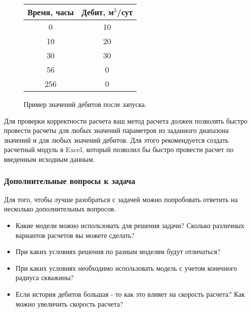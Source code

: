 
\begin{figure}[h!]
	\centering
	\begin{minipage}{0.45\textwidth}
		\centering
			\begin{tabular}{|c|c|}
				\hline
				\rowcolor{lightgray}	Время, часы& Дебит, м$^3$/сут  \\
				\hline
				0 & 10  \\
				\hline
				10 & 20  \\
				\hline
				30 & 30  \\
				\hline
				56 & 0  \\
				\hline
				256 & 0 \\
				\hline
			\end{tabular}
			
	\end{minipage}
	\hfill
	\begin{minipage}{0.45\textwidth}
		\centering
	\end{minipage}

	\caption{Пример значений дебитов после запуска.} \label{fig:mult2}

	
\end{figure}

Для проверки корректности расчета ваш метод расчета должен позволять быстро провести расчеты для любых значений параметров из заданного диапазона значений и для любых значений дебитов. Для этого рекомендуется создать расчетный модуль в Excel, который позволил бы быстро провести расчет по введенным исходным данным.

\subsubsection{Дополнительные вопросы к задача}

Для того, чтобы лучше разобраться с задачей можно попробовать ответить на несколько дополнительных вопросов.
\begin{itemize}
	\item Какие модели можно использовать для решения задачи? Сколько различных вариантов расчетов вы можете сделать? 
	\item При каких условиях решения по разным моделям будут отличаться?
	\item При каких условиях необходимо использовать модель с учетом конечного радиуса скважины?
	\item Если история дебитов большая - то как это влияет на скорость расчета? Как можно увеличить скорость расчета?
\end{itemize}

